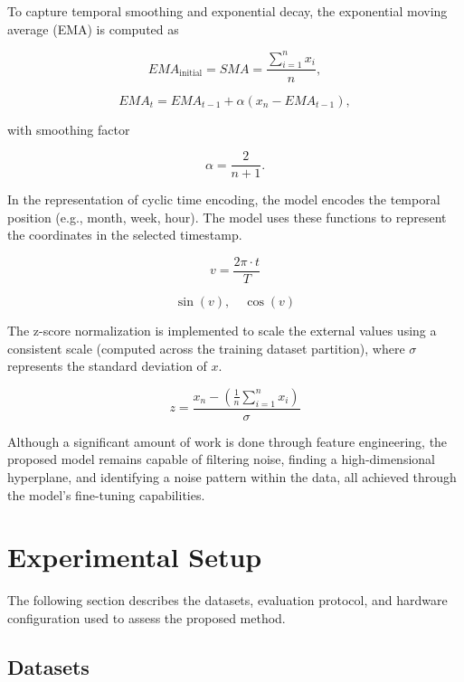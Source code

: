 \documentclass[conference]{IEEEtran}
\begin{document}
To capture temporal smoothing and exponential decay, the exponential moving average (EMA) is computed as

\begin{equation}
EMA_{\text{initial}} = SMA = \frac{\sum_{i=1}^{n}x_i}{n},
\end{equation}

\begin{equation}
EMA_t = EMA_{t-1} + \alpha(x_n - EMA_{t-1}),
\end{equation}

with smoothing factor

\begin{equation}
\alpha = \frac{2}{n + 1}.
\end{equation}

In the representation of cyclic time encoding, the model encodes the temporal position (e.g., month, week, hour). The model uses these functions to represent the coordinates in the selected timestamp.

\begin{equation}
v = \frac{2\pi \cdot t}{T}
\end{equation}

\begin{equation}
\sin(v), \quad \cos(v)
\end{equation}

The z-score normalization is implemented to scale the external values using a consistent scale (computed across the training dataset partition), where $\sigma$ represents the standard deviation of $x$.

\begin{equation}
z = \frac{x_n - (\frac{1}{n} \sum_{i=1}^{n} x_i)}{\sigma}
\end{equation}

Although a significant amount of work is done through feature engineering, the proposed model remains capable of filtering noise, finding a high-dimensional hyperplane, and identifying a noise pattern within the data, all achieved through the model’s fine-tuning capabilities.

\section{Experimental Setup}

The following section describes the datasets, evaluation protocol, and hardware configuration used to assess the proposed method.

\subsection{Datasets}
\end{document}
